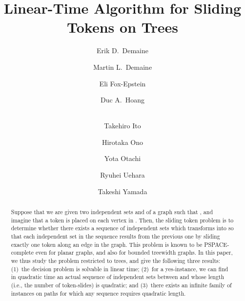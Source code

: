 \documentclass{llncs}
\newcounter{one}
\newcounter{two}
\newcounter{three}
\begin{document}
\title{Linear-Time Algorithm for Sliding Tokens on Trees}

\author{
Erik D.~Demaine \and
Martin L.~Demaine \and 
Eli Fox-Epstein \and 
Duc A.~Hoang \and \\
Takehiro Ito \and 
Hirotaka Ono \and
Yota Otachi \and 
Ryuhei Uehara \and 
Takeshi Yamada
}


\maketitle

\begin{abstract}
Suppose that we are given two independent sets  and  of 
a graph such that , 
and imagine that a token is placed on each vertex in . 
Then, the {\sc sliding token} problem is to determine whether 
there exists a sequence of independent sets which transforms  
into  so that each independent set in the sequence results from 
the previous one by sliding exactly one token along an edge in the graph. 
This problem is known to be PSPACE-complete even for planar graphs, and also for bounded treewidth graphs. 
In this paper, we thus study the problem restricted to trees, and give the following three results:
(1)~the decision problem is solvable in linear time; 
(2)~for a yes-instance, we can find in quadratic time an actual sequence of independent sets between  and  whose length (i.e., the number of token-slides) is quadratic; and 
(3)~there exists an infinite family of instances on paths for which any sequence requires quadratic length.
\end{abstract}
\end{document}
